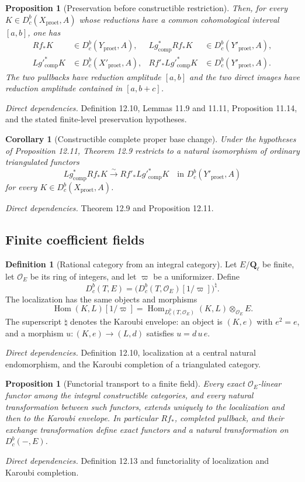 \documentclass[10pt]{article}
\newtheorem{proposition}[theorem]{Proposition}
\newtheorem{corollary}[theorem]{Corollary}
\theoremstyle{definition}
\newtheorem{definition}[theorem]{Definition}
\newcommand{\Hom}{\operatorname{Hom}}
\newcommand{\Ql}{\mathbf Q_\ell}
\newcommand{\Dbc}{D^b_c}
\newcommand{\Proet}{\mathrm{proet}}
\newcommand{\deps}[1]{\par\smallskip\textit{Direct dependencies.} #1\par}
\begin{document}
\begin{proposition}[Preservation before constructible restriction]
Then, for every $K\in\Dbc(X_{\Proet},A)$ whose reductions have a common
cohomological interval $[a,b]$, one has
\[
\begin{aligned}
 Rf_*K&\in\Dbc(Y_{\Proet},A),&
 Lg^*_{\mathrm{comp}}Rf_*K&\in\Dbc(Y'_{\Proet},A),\\
 Lg'^*_{\mathrm{comp}}K&\in\Dbc(X'_{\Proet},A),&
 Rf'_*Lg'^*_{\mathrm{comp}}K&\in\Dbc(Y'_{\Proet},A).
\end{aligned}
\]
The two pullbacks have reduction amplitude $[a,b]$ and the two direct
images have reduction amplitude contained in $[a,b+c]$.
\end{proposition}
\deps{Definition 12.10, Lemmas 11.9 and 11.11, Proposition 11.14, and the
stated finite-level preservation hypotheses.}

\begin{corollary}[Constructible complete proper base change]
Under the hypotheses of Proposition 12.11, Theorem 12.9 restricts to a
natural isomorphism of ordinary triangulated functors
\[
 Lg^*_{\mathrm{comp}}Rf_*K
 \xrightarrow{\sim}Rf'_*Lg'^*_{\mathrm{comp}}K
 \quad\text{in }\Dbc(Y'_{\Proet},A)
\]
for every $K\in\Dbc(X_{\Proet},A)$.
\end{corollary}
\deps{Theorem 12.9 and Proposition 12.11.}

\subsection{Finite coefficient fields}

\begin{definition}[Rational category from an integral category]
Let $E/\Ql$ be finite, let $\mathcal O_E$ be its ring of integers, and let
$\varpi$ be a uniformizer.  Define
\[
 \Dbc(T,E)=
 \bigl(\Dbc(T,\mathcal O_E)[1/\varpi]\bigr)^\natural.
\]
The localization has the same objects and morphisms
\[
 \Hom(K,L)[1/\varpi]
 =\Hom_{\Dbc(T,\mathcal O_E)}(K,L)\otimes_{\mathcal O_E}E.
\]
The superscript $\natural$ denotes the Karoubi envelope: an object is
$(K,e)$ with $e^2=e$, and a morphism
$u:(K,e)\to(L,d)$ satisfies $u=d\,u\,e$.
\end{definition}
\deps{Definition 12.10, localization at a central natural endomorphism,
and the Karoubi completion of a triangulated category.}

\begin{proposition}[Functorial transport to a finite field]
Every exact $\mathcal O_E$-linear functor among the integral constructible
categories, and every natural transformation between such functors,
extends uniquely to the localization and then to the Karoubi envelope.  In
particular $Rf_*$, completed pullback, and their exchange transformation
define exact functors and a natural transformation on $\Dbc(-,E)$.
\end{proposition}
\deps{Definition 12.13 and functoriality of localization and Karoubi
completion.}
\end{document}
